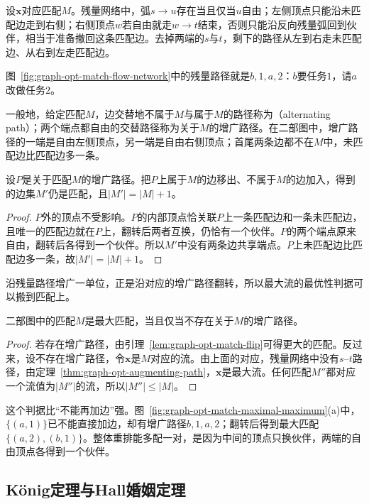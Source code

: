 设$\bm x$对应匹配$M$。残量网络中，弧$s\to u$存在当且仅当$u$自由；左侧顶点只能沿未匹配边走到右侧；右侧顶点$w$若自由就走$w\to t$结束，否则只能沿反向残量弧回到伙伴，相当于准备撤回这条匹配边。去掉两端的$s$与$t$，剩下的路径从左到右走未匹配边、从右到左走匹配边。

图~\ref{fig:graph-opt-match-flow-network}中的残量路径就是$b,1,a,2$：$b$要任务$1$，请$a$改做任务$2$。

一般地，给定匹配$M$，边交替地不属于$M$与属于$M$的路径称为（alternating path）；两个端点都自由的交替路径称为关于$M$的增广路径。在二部图中，增广路径的一端是自由左侧顶点，另一端是自由右侧顶点；首尾两条边都不在$M$中，未匹配边比匹配边多一条。

\begin{lemma}[沿增广路径翻转]
\label{lem:graph-opt-match-flip}
设$P$是关于匹配$M$的增广路径。把$P$上属于$M$的边移出、不属于$M$的边加入，得到的边集$M'$仍是匹配，且$|M'|=|M|+1$。
\end{lemma}

\begin{proof}
$P$外的顶点不受影响。$P$的内部顶点恰关联$P$上一条匹配边和一条未匹配边，且唯一的匹配边就在$P$上，翻转后两者互换，仍恰有一个伙伴。$P$的两个端点原来自由，翻转后各得到一个伙伴。所以$M'$中没有两条边共享端点。$P$上未匹配边比匹配边多一条，故$|M'|=|M|+1$。
\end{proof}

沿残量路径增广一单位，正是沿对应的增广路径翻转，所以最大流的最优性判据可以搬到匹配上。

\begin{theorem}[增广路径判据]
\label{thm:graph-opt-match-augmenting}
二部图中的匹配$M$是最大匹配，当且仅当不存在关于$M$的增广路径。
\end{theorem}

\begin{proof}
若存在增广路径，由引理~\ref{lem:graph-opt-match-flip}可得更大的匹配。反过来，设不存在增广路径，令$\bm x$是$M$对应的流。由上面的对应，残量网络中没有$s$--$t$路径，由定理~\ref{thm:graph-opt-augmenting-path}，$\bm x$是最大流。任何匹配$M''$都对应一个流值为$|M''|$的流，所以$|M''|\leq|M|$。
\end{proof}

这个判据比“不能再加边”强。图~\ref{fig:graph-opt-match-maximal-maximum}(a)中，$\{(a,1)\}$已不能直接加边，却有增广路径$b,1,a,2$；翻转后得到最大匹配$\{(a,2),(b,1)\}$。整体重排能多配一对，是因为中间的顶点只换伙伴，两端的自由顶点各得到一个伙伴。

\subsection{König定理与Hall婚姻定理}
\label{sec:bipartite-konig-hall}

